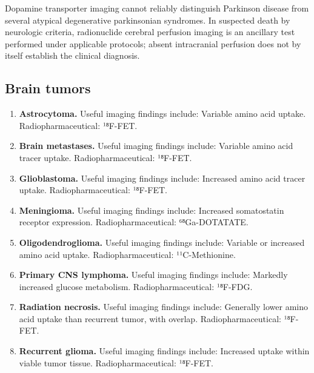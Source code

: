Dopamine transporter imaging cannot reliably distinguish Parkinson disease from several atypical degenerative parkinsonian syndromes.
In suspected death by neurologic criteria, radionuclide cerebral perfusion imaging is an ancillary test performed under applicable protocols; absent intracranial perfusion does not by itself establish the clinical diagnosis.

\subsection{Brain tumors}
\begin{enumerate}[leftmargin=*,itemsep=0.45em,topsep=0.4em]
\item \textbf{Astrocytoma.} Useful imaging findings include: Variable amino acid uptake. Radiopharmaceutical: ¹⁸F-FET.
\item \textbf{Brain metastases.} Useful imaging findings include: Variable amino acid tracer uptake. Radiopharmaceutical: ¹⁸F-FET.
\item \textbf{Glioblastoma.} Useful imaging findings include: Increased amino acid tracer uptake. Radiopharmaceutical: ¹⁸F-FET.
\item \textbf{Meningioma.} Useful imaging findings include: Increased somatostatin receptor expression. Radiopharmaceutical: ⁶⁸Ga-DOTATATE.
\item \textbf{Oligodendroglioma.} Useful imaging findings include: Variable or increased amino acid uptake. Radiopharmaceutical: ¹¹C-Methionine.
\item \textbf{Primary CNS lymphoma.} Useful imaging findings include: Markedly increased glucose metabolism. Radiopharmaceutical: ¹⁸F-FDG.
\item \textbf{Radiation necrosis.} Useful imaging findings include: Generally lower amino acid uptake than recurrent tumor, with overlap. Radiopharmaceutical: ¹⁸F-FET.
\item \textbf{Recurrent glioma.} Useful imaging findings include: Increased uptake within viable tumor tissue. Radiopharmaceutical: ¹⁸F-FET.
\end{enumerate}

